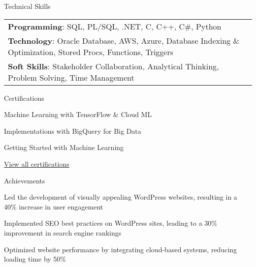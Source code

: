 \documentclass{resume} %
\begin{document}
    \begin{rSection}{Technical Skills}
        \begin{tabular}{ @{} l @{	} l }
                                \textbf{Programming}: SQL, PL/SQL, .NET, C, C++, C\#, Python\\
                                \textbf{Technology}: Oracle Database, AWS, Azure, Database Indexing \& Optimization, Stored Procs, Functions, Triggers\\
                                \textbf{Soft Skills}: Stakeholder Collaboration, Analytical Thinking, Problem Solving, Time Management\\
        \end{tabular}
    \end{rSection}

    \begin{rSection}{Certifications}
        \begin{rSubsection}{}{}{}
                            \item Machine Learning with TensorFlow \& Cloud ML
                            \item Implementations with BigQuery for Big Data
                            \item Getting Started with Machine Learning
                    \end{rSubsection}
        \href{https://skillsoft.digitalbadges.skillsoft.com/profile/umairsaeed185770/wallet}{View all certifications}
    \end{rSection}

    \begin{rSection}{Achievements}
        \begin{rSubsection}{}{}{}
                            \item Led the development of visually appealing WordPress websites, resulting in a 40\% increase in user engagement
                            \item Implemented SEO best practices on WordPress sites, leading to a 30\% improvement in search engine rankings
                            \item Optimized website performance by integrating cloud{-}based systems, reducing loading time by 50\%
                    \end{rSubsection}
    \end{rSection}
\end{document}
